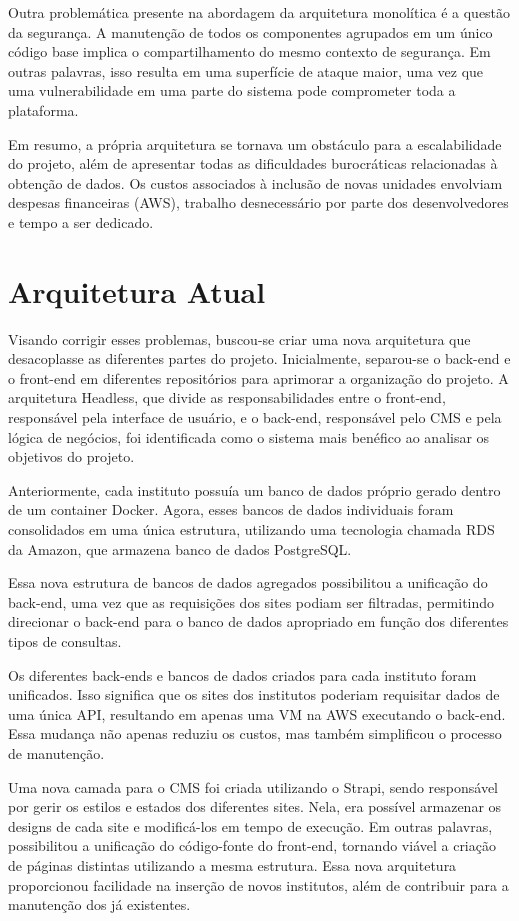 Outra problemática presente na abordagem da arquitetura monolítica é a questão da segurança. A manutenção de todos os componentes agrupados em um único código base implica o compartilhamento do mesmo contexto de segurança. Em outras palavras, isso resulta em uma superfície de ataque maior, uma vez que uma vulnerabilidade em uma parte do sistema pode comprometer toda a plataforma.

Em resumo, a própria arquitetura se tornava um obstáculo para a escalabilidade do projeto, além de apresentar todas as dificuldades burocráticas relacionadas à obtenção de dados. Os custos associados à inclusão de novas unidades envolviam despesas financeiras (AWS), trabalho desnecessário por parte dos desenvolvedores e tempo a ser dedicado.


\section{Arquitetura Atual}

Visando corrigir esses problemas, buscou-se criar uma nova arquitetura que desacoplasse as diferentes partes do projeto. Inicialmente, separou-se o back-end e o front-end em diferentes repositórios para aprimorar a organização do projeto. A arquitetura Headless, que divide as responsabilidades entre o front-end, responsável pela interface de usuário, e o back-end, responsável pelo CMS e pela lógica de negócios, foi identificada como o sistema mais benéfico ao analisar os objetivos do projeto.

Anteriormente, cada instituto possuía um banco de dados próprio gerado dentro de um container Docker. Agora, esses bancos de dados individuais foram consolidados em uma única estrutura, utilizando uma tecnologia chamada RDS da Amazon, que armazena banco de dados PostgreSQL.

Essa nova estrutura de bancos de dados agregados possibilitou a unificação do back-end, uma vez que as requisições dos sites podiam ser filtradas, permitindo direcionar o back-end para o banco de dados apropriado em função dos diferentes tipos de consultas.

Os diferentes back-ends e bancos de dados criados para cada instituto foram unificados. Isso significa que os sites dos institutos poderiam requisitar dados de uma única API, resultando em apenas uma VM na AWS executando o back-end. Essa mudança não apenas reduziu os custos, mas também simplificou o processo de manutenção.

Uma nova camada para o CMS foi criada utilizando o Strapi, sendo responsável por gerir os estilos e estados dos diferentes sites. Nela, era possível armazenar os designs de cada site e modificá-los em tempo de execução. Em outras palavras, possibilitou a unificação do código-fonte do front-end, tornando viável a criação de páginas distintas utilizando a mesma estrutura. Essa nova arquitetura proporcionou facilidade na inserção de novos institutos, além de contribuir para a manutenção dos já existentes.

